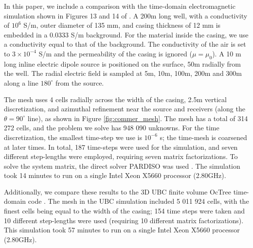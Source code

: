 In this paper, we include a comparison with the time-domain electromagnetic simulation shown in Figures 13 and 14 of \cite{Commer2015}. A 200m long well, with a conductivity of $10^{6}$ S/m, outer diameter of 135 mm, and casing thickness of 12 mm is embedded in a 0.0333 S/m background. For the material inside the casing, we use a conductivity equal to that of the background. The conductivity of the air is set to $3 \times 10^{-4}$ S/m and the permeability of the casing is ignored ($\mu = \mu_0$). A 10 m long inline electric dipole source is positioned on the surface, 50m radially from the well. The radial electric field is sampled at 5m, 10m, 100m, 200m and 300m along a line $180^{\circ}$ from the source.

The mesh uses 4 cells radially across the width of the casing, 2.5m vertical discretization, and azimuthal refinement near the source and receivers (along the $\theta=90^\circ$ line), as shown in Figure \ref{fig:commer_mesh}. The mesh has a total of 314 272 cells, and the problem we solve has 948 090 unknowns. For the time discretization, the smallest time-step we use is $10^{-6}$ s; the time-mesh is coarsened at later times. In total, 187 time-steps were used for the simulation, and seven different step-lengths were employed, requiring seven matrix factorizations. To solve the system matrix, the direct solver PARDISO was used \citep{Petra2014, Cosmin2016}. The simulation took 14 minutes to run on a single Intel Xeon X5660 processor (2.80GHz).

Additionally, we compare these results to the 3D UBC finite volume OcTree time-domain code \cite{Haber2014}. The mesh in the UBC simulation included 5 011 924 cells, with the finest cells being equal to the width of the casing; 154 time steps were taken and 10 different step-lengths were used (requiring 10 different matrix factorizations). This simulation took 57 minutes to run on a single Intel Xeon X5660 processor (2.80GHz).






